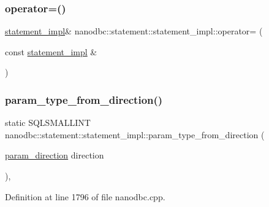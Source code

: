 \subsubsection{\texorpdfstring{operator=()}{operator=()}}
{\footnotesize\ttfamily \mbox{\hyperlink{classnanodbc_1_1statement_1_1statement__impl}{statement\+\_\+impl}}\& nanodbc\+::statement\+::statement\+\_\+impl\+::operator= (\begin{DoxyParamCaption}\item[{const \mbox{\hyperlink{classnanodbc_1_1statement_1_1statement__impl}{statement\+\_\+impl}} \&}]{ }\end{DoxyParamCaption})\hspace{0.3cm}{\ttfamily [delete]}}

\mbox{\label{classnanodbc_1_1statement_1_1statement__impl_ad24517cc760acd4974be1abb67856ddb}} 
\subsubsection{\texorpdfstring{param\_type\_from\_direction()}{param\_type\_from\_direction()}}
{\footnotesize\ttfamily static S\+Q\+L\+S\+M\+A\+L\+L\+I\+NT nanodbc\+::statement\+::statement\+\_\+impl\+::param\+\_\+type\+\_\+from\+\_\+direction (\begin{DoxyParamCaption}\item[{\mbox{\hyperlink{classnanodbc_1_1statement_a523142f53cbbee8d68a074da993e7fa6}{param\+\_\+direction}}}]{direction }\end{DoxyParamCaption})\hspace{0.3cm}{\ttfamily [inline]}, {\ttfamily [static]}}



Definition at line 1796 of file nanodbc.\+cpp.

\mbox{\label{classnanodbc_1_1statement_1_1statement__impl_ada0f706dbba2ab234ba2d3bff416e6fd}} 
